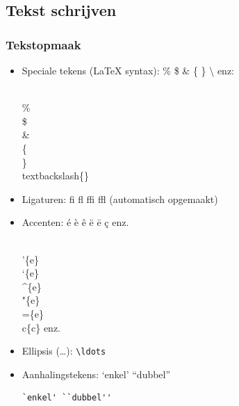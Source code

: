 \documentclass[aspectratio=169]{beamer}
\begin{document}
\subsection{Tekst schrijven}

\begin{frame}[fragile]
  \frametitle{Tekstopmaak}
  
  \begin{itemize}
  \item<+-> Speciale tekens ({\LaTeX} syntax): \% \$ \& \{ \} \textbackslash{} enz: \\
\begin{semiverbatim}
\\\% \\\$ \\\& \\\{ \\\} \\textbackslash\{\}
\end{semiverbatim}
  \item<+-> Ligaturen: \textrm{fi fl ffi ffl} (automatisch opgemaakt)
  \item<+-> Accenten: \'{e} \`{e} \^{e} \"{e} \={e} \c{c} enz.
\begin{semiverbatim}
\\'\{e\} \\`\{e\} \\^\{e\} \\"\{e\} \\=\{e\} \\c\{c\} enz.
\end{semiverbatim}
  \item<+-> Ellipsis (\ldots): \texttt{\textbackslash{}ldots}
  \item<+-> Aanhalingstekens: `enkel' ``dubbel''
\begin{verbatim}
`enkel' ``dubbel''
\end{verbatim}
  \end{itemize}
\end{frame}
\end{document}
